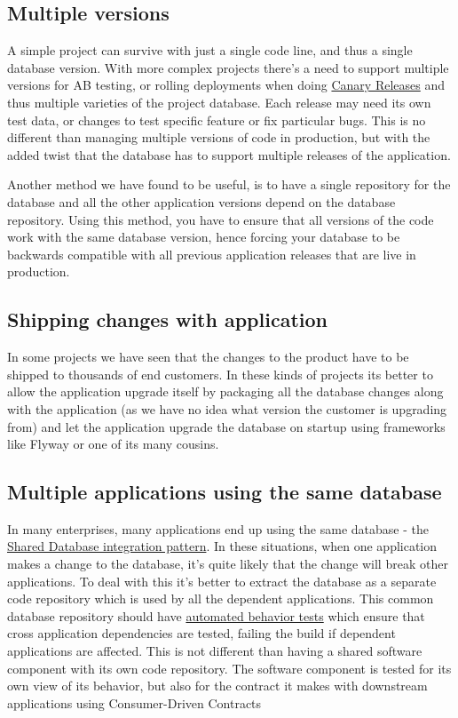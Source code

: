 \documentclass[12pt]{article}
\begin{document}
\subsection{Multiple versions}

A simple project can survive with just a single code line, and thus a
single database version. With more complex projects there's a need to
support multiple versions for AB testing, or rolling deployments when
doing \href{https://martinfowler.com/bliki/CanaryRelease.html}{Canary
Releases} and thus multiple varieties of the project database. Each
release may need its own test data, or changes to test specific feature
or fix particular bugs. This is no different than managing multiple
versions of code in production, but with the added twist that the
database has to support multiple releases of the application.

Another method we have found to be useful, is to have a single
repository for the database and all the other application versions
depend on the database repository. Using this method, you have to ensure
that all versions of the code work with the same database version, hence
forcing your database to be backwards compatible with all previous
application releases that are live in production.

\subsection{Shipping changes with application}

In some projects we have seen that the changes to the product have to be
shipped to thousands of end customers. In these kinds of projects its
better to allow the application upgrade itself by packaging all the
database changes along with the application (as we have no idea what
version the customer is upgrading from) and let the application upgrade
the database on startup using frameworks like Flyway or one of its many
cousins.

\subsection{Multiple applications using the same database}

In many enterprises, many applications end up using the same database -
the
\href{http://enterpriseintegrationpatterns.com/SharedDataBaseIntegration.html}{Shared
Database integration pattern}. In these situations, when one application
makes a change to the database, it’s quite likely that the change will
break other applications. To deal with this it’s better to extract the
database as a separate code repository which is used by all the
dependent applications. This common database repository should have
\href{http://sadalage.com/blog/2015/08/16/behavior-driven-database-development}{automated
behavior tests} which ensure that cross application dependencies are
tested, failing the build if dependent applications are affected. This
is not different than having a shared software component with its own
code repository. The software component is tested for its own view of
its behavior, but also for the contract it makes with downstream
applications using Consumer-Driven Contracts
\end{document}
